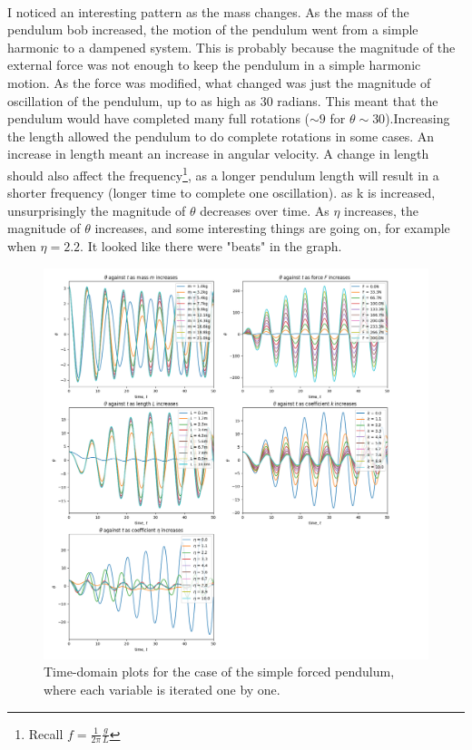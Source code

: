 \documentclass[10pt, twocolumn]{article}
\begin{document}
\\
I noticed an interesting pattern as the mass changes. As the mass of the pendulum bob increased, the motion of the pendulum went from a simple harmonic to a dampened system. This is probably because the magnitude of the external force was not enough to keep the pendulum in a simple harmonic motion. As the force was modified, what changed was just the magnitude of oscillation of the pendulum, up to as high as 30 radians. This meant that the pendulum would have completed many full rotations ($\sim{9}$ for $\theta\sim{30}$).Increasing the length allowed the pendulum to do complete rotations in some cases. An increase in length meant an increase in angular velocity. A change in length should also affect the frequency\footnote{Recall $f = \frac{1}{2\pi}\frac{g}{L}$}, as a longer pendulum length will result in a shorter frequency (longer time to complete one oscillation). as k is increased, unsurprisingly the magnitude of $\theta$ decreases over time. As $\eta$ increases, the magnitude of $\theta$ increases, and some interesting things are going on, for example when $\eta = 2.2$. It looked like there were "beats" in the graph.

\onecolumn
\begin{figure}
    \centering
    \includegraphics[width = 1.1\columnwidth]{Projects/ForcedSimplePendulum/Plots/test_plots.png}
    \caption{Time-domain plots for the case of the simple forced pendulum, where each variable is iterated one by one.}
    \label{time domain test}
\end{figure}
\end{document}
